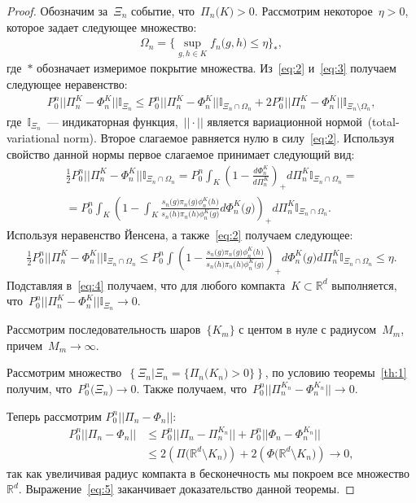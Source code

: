 \documentclass[../main.tex]{subfiles}
\begin{document}
\begin{proof}
Обозначим за~$\Xi_n$ событие, что~$\Pi_n\bigr(K\bigr)>0$.  Рассмотрим некоторое~$\eta > 0$, которое задает следующее множество:
\[
\label{eq:3}
\begin{aligned}
\Omega_n = \{\sup_{g,h\in K}f_n\bigr(g,h\bigr) \leq \eta\}_*,
\end{aligned}
\]
где~$*$ обозначает измеримое покрытие множества. Из~\eqref{eq:2} и~\eqref{eq:3} получаем следующее неравенство:
\[
\label{eq:4}
\begin{aligned}
P_0^n||\Pi_n^K - \Phi_n^K||\mathbb{I}_{\Xi_n} \leq P_0^n||\Pi_n^K - \Phi_n^K||\mathbb{I}_{\Xi_n\cap \Omega_n} + 2P_0^n||\Pi_n^K - \Phi_n^K||\mathbb{I}_{\Xi_n \setminus \Omega_n},
\end{aligned}
\]
где~$\mathbb{I}_{\Xi_n}$~--- индикаторная функция,~$||\cdot||$ является вариационной нормой~(total-variational norm). Второе слагаемое равняется нулю в силу~\eqref{eq:2}. Используя свойство данной нормы первое слагаемое принимает следующий вид:
\[
\begin{aligned}
\frac{1}{2}P_0^n||\Pi_n^K - \Phi_n^K||\mathbb{I}_{\Xi_n\cap \Omega_n}  = P_0^n\int_K\left(1-\frac{d\Phi_n^K}{d\Pi_n^K}\right)_+d\Pi_n^K\mathbb{I}_{\Xi_n\cap \Omega_n} = \\
=P_0^n\int_K\left(1-\int_K\frac{s_n\bigr(g\bigr)\pi_n\bigr(g\bigr)\phi^K_n\bigr(h\bigr)}{s_n\bigr(h\bigr)\pi_n\bigr(h\bigr)\phi^K_n\bigr(g\bigr)}d\Phi_n^K\bigr(g\bigr)\right)_+d\Pi_n^K\mathbb{I}_{\Xi_n\cap \Omega_n}.
\end{aligned}
\]
Используя неравенство Йенсена, а также~\eqref{eq:2} получаем следующее:
\[
\begin{aligned}
\frac{1}{2}P_0^n||\Pi_n^K - \Phi_n^K||\mathbb{I}_{\Xi_n\cap \Omega_n}  \leq P_0^n\int\left(1-\frac{s_n\bigr(g\bigr)\pi_n\bigr(g\bigr)\phi^K_n\bigr(h\bigr)}{s_n\bigr(h\bigr)\pi_n\bigr(h\bigr)\phi^K_n\bigr(g\bigr)}\right)_+d\Phi_n^K\bigr(g\bigr)d\Pi_n^K\mathbb{I}_{\Xi_n\cap \Omega_n} \leq \eta.
\end{aligned}
\]
Подставляя в~\eqref{eq:4} получаем, что для любого компакта~$K\subset \mathbb{R}^d$ выполняется, что~$P_0^n||\Pi_n^K - \Phi_n^K||\mathbb{I}_{\Xi_n} \to 0$.

Рассмотрим последовательность шаров~$\{K_m\}$ с центом в нуле с радиусом~$M_m$, причем~$M_m \to \infty$.

Рассмотрим множество~$\left\{\Xi_n| \Xi_n = \{\Pi_n\bigr(K_n\bigr)>0\}\right\}$, по условию теоремы~\eqref{th:1} получим, что~$P^n_0\bigr(\Xi_n\bigr) \to 0$. Также получаем, что~$P_0^n||\Pi_n^{K_n} - \Phi_n^{K_n}||\to 0$.

Теперь рассмотрим $P_0^n||\Pi_n - \Phi_n||$:
\[
\label{eq:5}
\begin{aligned}
P_0^n||\Pi_n - \Phi_n|| &\leq P_0^n||\Pi_n - \Pi_n^{K_n}|| + P_0^n||\Phi_n - \Phi_n^{K_n}|| \\
&\leq 2\left(\Pi\bigr(\mathbb{R}^{d}\setminus K_n\bigr)\right) + 2\left(\Phi\bigr(\mathbb{R}^{d}\setminus K_n\bigr)\right) \to 0,
\end{aligned}
\]
так как увеличивая радиус компакта в бесконечность мы покроем все множество~$\mathbb{R}^d$. Выражение~\eqref{eq:5} заканчивает доказательство данной теоремы.
\end{proof}
\end{document}
